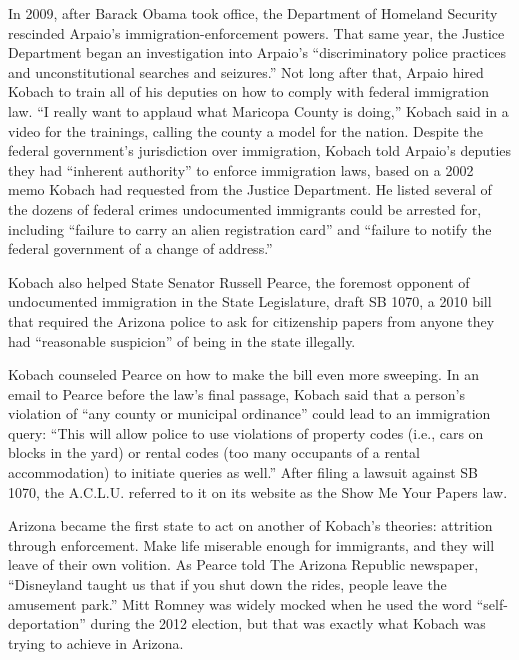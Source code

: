 In 2009, after Barack Obama took office, the Department of Homeland
Security rescinded Arpaio's immigration-enforcement powers. That same
year, the Justice Department began an investigation into Arpaio's
``discriminatory police practices and unconstitutional searches and
seizures.'' Not long after that, Arpaio hired Kobach to train all of his
deputies on how to comply with federal immigration law. ``I really want
to applaud what Maricopa County is doing,'' Kobach said in a video for
the trainings, calling the county a model for the nation. Despite the
federal government's jurisdiction over immigration, Kobach told Arpaio's
deputies they had ``inherent authority'' to enforce immigration laws,
based on a 2002 memo Kobach had requested from the Justice Department.
He listed several of the dozens of federal crimes undocumented
immigrants could be arrested for, including ``failure to carry an alien
registration card'' and ``failure to notify the federal government of a
change of address.''

Kobach also helped State Senator Russell Pearce, the foremost opponent
of undocumented immigration in the State Legislature, draft SB 1070, a
2010 bill that required the Arizona police to ask for citizenship papers
from anyone they had ``reasonable suspicion'' of being in the state
illegally.

Kobach counseled Pearce on how to make the bill even more sweeping. In
an email to Pearce before the law's final passage, Kobach said that a
person's violation of ``any county or municipal ordinance'' could lead
to an immigration query: ``This will allow police to use violations of
property codes (i.e., cars on blocks in the yard) or rental codes (too
many occupants of a rental accommodation) to initiate queries as well.''
After filing a lawsuit against SB 1070, the A.C.L.U. referred to it on
its website as the Show Me Your Papers law.

Arizona became the first state to act on another of Kobach's theories:
attrition through enforcement. Make life miserable enough for
immigrants, and they will leave of their own volition. As Pearce told
The Arizona Republic newspaper, ``Disneyland taught us that if you shut
down the rides, people leave the amusement park.'' Mitt Romney was
widely mocked when he used the word ``self-deportation'' during the 2012
election, but that was exactly what Kobach was trying to achieve in
Arizona.


